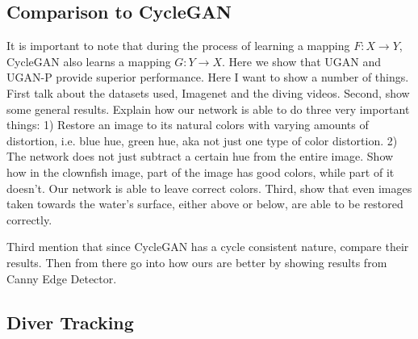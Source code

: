 \documentclass[conference,reqno]{IEEEtran}
\begin{document}
\subsection{Comparison to CycleGAN}

It is important to note that during the process of learning a mapping $F: X \rightarrow Y$, CycleGAN also learns a
mapping $G: Y \rightarrow X$. Here we show that UGAN and UGAN-P provide superior performance.
Here I want to show a number of things. First talk about the datasets used, Imagenet and the diving videos.
Second, show some general results. Explain how our network is able to do three very important things: 1) Restore an
image to its natural colors with varying amounts of distortion, i.e. blue hue, green hue, aka not just one type of
color distortion. 2) The network does not just subtract a certain hue from the entire image. Show how in the clownfish
image, part of the image has good colors, while part of it doesn't. Our network is able to leave correct colors. Third,
show that even images taken towards the water's surface, either above or below, are able to be restored correctly.

Third mention that since CycleGAN has a cycle consistent nature, compare their results. Then from there go into how
ours are better by showing results from Canny Edge Detector.

\subsection{Diver Tracking}
\end{document}
